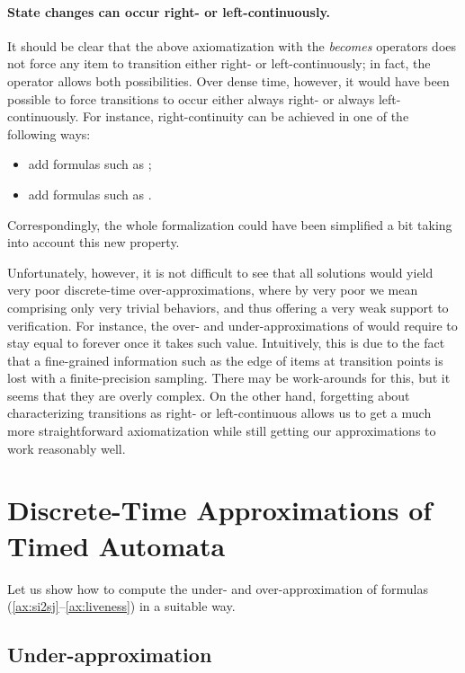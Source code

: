 \documentclass[a4paper]{article}
\newcommand{\fsrf}[2]{(\ref{#1}--\ref{#2})}
\theoremstyle{plain}
\theoremstyle{definition}
\begin{document}
\paragraph{State changes can occur right- or left-continuously.}
It should be clear that the above axiomatization with the \emph{becomes} operators does not force any item to transition either right- or left-continuously; in fact, the operator allows both possibilities.
Over dense time, however, it would have been possible to force transitions to occur either always right- or always left-continuously.
For instance, right-continuity can be achieved in one of the following ways:
\begin{itemize}
  \item add formulas such as ;
  \item add formulas such as .
\end{itemize}
Correspondingly, the whole formalization could have been simplified a bit taking into account this new property.

Unfortunately, however, it is not difficult to see that all solutions would yield very poor discrete-time over-ap\-prox\-i\-ma\-tions, where by very poor we mean comprising only very trivial behaviors, and thus offering a very weak support to verification.
For instance, the over- and under-ap\-prox\-i\-ma\-tions of  would require  to stay equal to  forever once it takes such value.
Intuitively, this is due to the fact that a fine-grained information such as the edge of items at transition points is lost with a finite-precision sampling.
There may be work-arounds for this, but it seems that they are overly complex.
On the other hand, forgetting about characterizing transitions as right- or left-continuous allows us to get a much more straightforward axiomatization while still getting our approximations to work reasonably well.







\section{Discrete-Time Approximations of Timed Automata} \label{sec:TA-approx}
Let us show how to compute the under- and over-ap\-prox\-i\-ma\-tion of formulas \fsrf{ax:si2sj}{ax:liveness} in a suitable way.




\subsection{Under-ap\-prox\-i\-ma\-tion}
\end{document}
